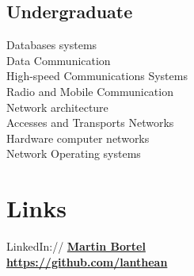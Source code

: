 \documentclass[letterpaper]{deedy-resume.en} %
\begin{document}
\begin{minipage}[t]{0.39\textwidth}
\sectionspace %


\subsection{Undergraduate}

Databases systems \\
Data Communication \\
High-speed Communications Systems \\
Radio and Mobile Communication \\
Network architecture \\
Accesses and Transports Networks \\
Hardware computer networks \\
Network Operating systems

\sectionspace %

\section{Links} 

LinkedIn:// \href{https://www.linkedin.com/in/martin-bortel-326b5227/}{\bf Martin Bortel} \\
\href{https://github.com/lanthean}{\bf https://github.com/lanthean} \\

\sectionspace %
\end{minipage} %
%
\end{document}
